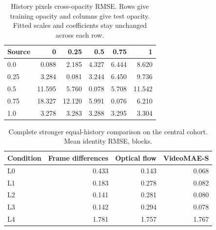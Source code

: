 \begin{table}[!htbp]
\centering\small
\caption{History pixels cross-opacity RMSE. Rows give training opacity and columns give test opacity. Fitted scales and coefficients stay unchanged across each row.}
\label{tab:opacity-OPACITY_PIXELS}
\begin{tabular}{@{}lrrrrr@{}}
\toprule
Source & 0 & 0.25 & 0.5 & 0.75 & 1\\
\midrule
0.0 & 0.088 & 2.185 & 4.327 & 6.444 & 8.620\\
0.25 & 3.284 & 0.081 & 3.244 & 6.450 & 9.736\\
0.5 & 11.595 & 5.760 & 0.078 & 5.708 & 11.542\\
0.75 & 18.327 & 12.120 & 5.991 & 0.076 & 6.210\\
1.0 & 3.278 & 3.283 & 3.288 & 3.295 & 3.304\\
\bottomrule
\end{tabular}
\end{table}

\begin{table}[!htbp]
\centering\small
\caption{Complete stronger equal-history comparison on the central cohort. Mean identity RMSE, blocks.}
\label{tab:stronger-history}
\begin{tabular}{@{}lrrr@{}}
\toprule
Condition & Frame differences & Optical flow & VideoMAE-S\\
\midrule
L0 & 0.433 & 0.143 & 0.068\\
L1 & 0.183 & 0.278 & 0.082\\
L2 & 0.141 & 0.281 & 0.080\\
L3 & 0.142 & 0.294 & 0.078\\
L4 & 1.781 & 1.757 & 1.767\\
\bottomrule
\end{tabular}
\end{table}
